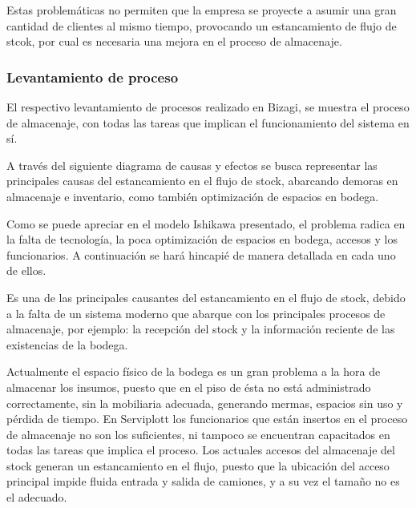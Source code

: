 Estas problemáticas no permiten que la empresa se proyecte a asumir una gran cantidad de clientes al mismo tiempo, provocando un estancamiento de flujo de stcok, por cual es necesaria una mejora en el proceso de almacenaje.
    \subsubsection{Levantamiento de proceso}
    El respectivo levantamiento de procesos realizado en Bizagi, se muestra el proceso de almacenaje, con todas las tareas que implican el funcionamiento del sistema en sí.

	A través del siguiente diagrama de causas y efectos se busca representar las
principales causas del estancamiento en el flujo de stock, abarcando demoras en
almacenaje e inventario, como también optimización de espacios en bodega.	


Como se puede apreciar en el modelo Ishikawa presentado, el problema radica en la
falta de tecnología, la poca optimización de espacios en bodega, accesos y los
funcionarios. A continuación se hará hincapié de manera detallada en cada uno de
ellos.

 Es una de las principales causantes del estancamiento en el flujo de stock, debido a la falta de un sistema moderno que abarque con los principales procesos de almacenaje, por ejemplo: la recepción del stock y la información reciente de las existencias de la bodega.

 Actualmente el espacio físico de la bodega es un gran problema a la hora de almacenar los insumos, puesto que en el piso de ésta no está administrado correctamente, sin la mobiliaria adecuada,
generando mermas, espacios sin uso y pérdida de tiempo.
 En Serviplott los funcionarios que están insertos en el proceso de almacenaje no son los suficientes, ni tampoco se encuentran capacitados en todas las tareas que implica el proceso.
 Los actuales accesos del almacenaje del stock generan un estancamiento en el flujo, puesto que la ubicación del acceso principal impide fluida entrada y salida de camiones, y a su vez el tamaño no es el adecuado.

